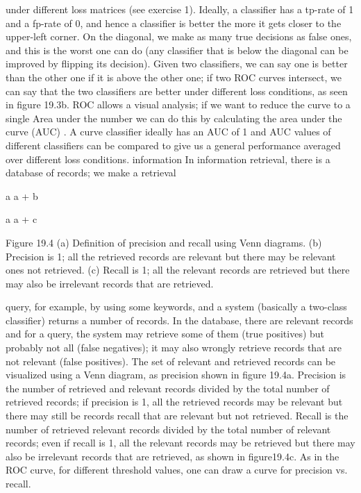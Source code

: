 under different loss matrices (see exercise 1). Ideally, a classifier has a tp-rate of 1 and a fp-rate of 0, and hence a classifier is better the more it gets closer to the upper-left corner. On the diagonal, we make as many true decisions as false ones, and this is the worst one can do (any classifier that is below the diagonal can be improved by flipping its decision). Given two classifiers, we can say one is better than the other one if it is above the other one; if two ROC curves intersect, we can say that the two classifiers are better under different loss conditions, as seen in figure 19.3b. ROC allows a visual analysis; if we want to reduce the curve to a single Area under the number we can do this by calculating the area under the curve (AUC) . A curve classifier ideally has an AUC of 1 and AUC values of different classifiers can be compared to give us a general performance averaged over different loss conditions. information In information retrieval, there is a database of records; we make a retrieval

a a + b

a a + c

Figure 19.4 (a) Definition of precision and recall using Venn diagrams. (b) Precision is 1; all the retrieved records are relevant but there may be relevant ones not retrieved. (c) Recall is 1; all the relevant records are retrieved but there may also be irrelevant records that are retrieved.

query, for example, by using some keywords, and a system (basically a two-class classifier) returns a number of records. In the database, there are relevant records and for a query, the system may retrieve some of them (true positives) but probably not all (false negatives); it may also wrongly retrieve records that are not relevant (false positives). The set of relevant and retrieved records can be visualized using a Venn diagram, as precision shown in figure 19.4a. Precision is the number of retrieved and relevant records divided by the total number of retrieved records; if precision is 1, all the retrieved records may be relevant but there may still be records recall that are relevant but not retrieved. Recall is the number of retrieved relevant records divided by the total number of relevant records; even if recall is 1, all the relevant records may be retrieved but there may also be irrelevant records that are retrieved, as shown in figure19.4c. As in the ROC curve, for different threshold values, one can draw a curve for precision vs. recall.

